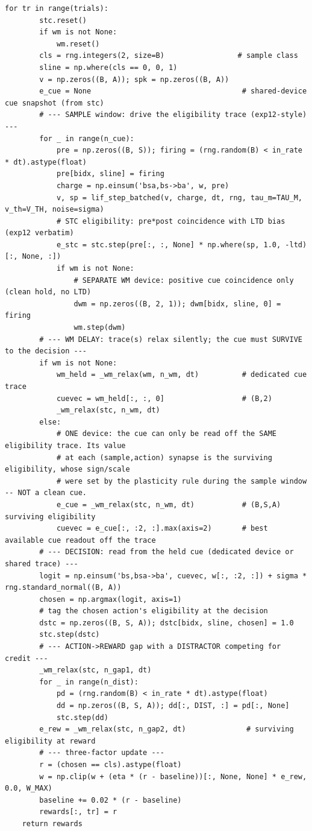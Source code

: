 \begin{lstlisting}[caption={mrl\_trace/extensions.py},label={lst:siox-src-extensions}]
    for tr in range(trials):
        stc.reset()
        if wm is not None:
            wm.reset()
        cls = rng.integers(2, size=B)                 # sample class
        sline = np.where(cls == 0, 0, 1)
        v = np.zeros((B, A)); spk = np.zeros((B, A))
        e_cue = None                                   # shared-device cue snapshot (from stc)
        # --- SAMPLE window: drive the eligibility trace (exp12-style) ---
        for _ in range(n_cue):
            pre = np.zeros((B, S)); firing = (rng.random(B) < in_rate * dt).astype(float)
            pre[bidx, sline] = firing
            charge = np.einsum('bsa,bs->ba', w, pre)
            v, sp = lif_step_batched(v, charge, dt, rng, tau_m=TAU_M, v_th=V_TH, noise=sigma)
            # STC eligibility: pre*post coincidence with LTD bias (exp12 verbatim)
            e_stc = stc.step(pre[:, :, None] * np.where(sp, 1.0, -ltd)[:, None, :])
            if wm is not None:
                # SEPARATE WM device: positive cue coincidence only (clean hold, no LTD)
                dwm = np.zeros((B, 2, 1)); dwm[bidx, sline, 0] = firing
                wm.step(dwm)
        # --- WM DELAY: trace(s) relax silently; the cue must SURVIVE to the decision ---
        if wm is not None:
            wm_held = _wm_relax(wm, n_wm, dt)          # dedicated cue trace
            cuevec = wm_held[:, :, 0]                  # (B,2)
            _wm_relax(stc, n_wm, dt)
        else:
            # ONE device: the cue can only be read off the SAME eligibility trace. Its value
            # at each (sample,action) synapse is the surviving eligibility, whose sign/scale
            # were set by the plasticity rule during the sample window -- NOT a clean cue.
            e_cue = _wm_relax(stc, n_wm, dt)           # (B,S,A) surviving eligibility
            cuevec = e_cue[:, :2, :].max(axis=2)       # best available cue readout off the trace
        # --- DECISION: read from the held cue (dedicated device or shared trace) ---
        logit = np.einsum('bs,bsa->ba', cuevec, w[:, :2, :]) + sigma * rng.standard_normal((B, A))
        chosen = np.argmax(logit, axis=1)
        # tag the chosen action's eligibility at the decision
        dstc = np.zeros((B, S, A)); dstc[bidx, sline, chosen] = 1.0
        stc.step(dstc)
        # --- ACTION->REWARD gap with a DISTRACTOR competing for credit ---
        _wm_relax(stc, n_gap1, dt)
        for _ in range(n_dist):
            pd = (rng.random(B) < in_rate * dt).astype(float)
            dd = np.zeros((B, S, A)); dd[:, DIST, :] = pd[:, None]
            stc.step(dd)
        e_rew = _wm_relax(stc, n_gap2, dt)              # surviving eligibility at reward
        # --- three-factor update ---
        r = (chosen == cls).astype(float)
        w = np.clip(w + (eta * (r - baseline))[:, None, None] * e_rew, 0.0, W_MAX)
        baseline += 0.02 * (r - baseline)
        rewards[:, tr] = r
    return rewards



\end{lstlisting}
